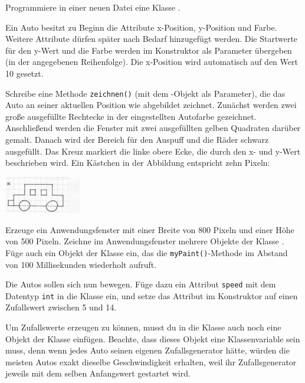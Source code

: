 \begin{compactenum}[a)]
\item Programmiere in einer neuen Datei eine Klasse .

\item Ein Auto besitzt zu Beginn die Attribute x-Position, y-Position und
Farbe. Weitere Attribute dürfen später nach Bedarf hinzugefügt werden. Die
Startwerte für den y-Wert und die Farbe werden im Konstruktor als Parameter
übergeben (in der angegebenen Reihenfolge). Die x-Position wird automatisch auf
den Wert 10 gesetzt.

Schreibe eine Methode \lstinline|zeichnen()| (mit dem -Objekt
als Parameter), die das Auto an seiner aktuellen Position wie abgebildet
zeichnet. Zunächst werden zwei große ausgefüllte Rechtecke in der eingestellten
Autofarbe gezeichnet. Anschließend werden die Fenster mit zwei ausgefüllten
gelben Quadraten darüber gemalt. Danach wird der Bereich für den Auspuff und
die Räder schwarz ausgefüllt. Das Kreuz markiert die linke obere Ecke, die durch
den x- und y-Wert beschrieben wird. Ein Kästchen in der Abbildung entspricht
zehn Pixeln:

\begin{center}
\includegraphics[width=0.25\textwidth]{./inf/SEKII/10_Java_Klassen/auto.jpg}
\end{center}

\item Erzeuge ein Anwendungsfenster mit einer Breite von 800 Pixeln und einer
Höhe von 500 Pixeln. Zeichne im Anwendungsfenster mehrere Objekte der Klasse
. Füge auch ein Objekt der Klasse  ein, das die
\lstinline|myPaint()|-Methode im Abstand von 100 Millisekunden wiederholt
aufruft.

\item Die Autos sollen sich nun bewegen. Füge dazu ein Attribut
\lstinline|speed| mit dem Datentyp \lstinline|int| in die Klasse ein, und setze
das Attribut im Konstruktor auf einen Zufallswert zwischen 5 und 14.

Um Zufallswerte erzeugen zu können, musst du in die Klasse  auch
noch eine Objekt der Klasse  einfügen. Beachte, dass dieses
Objekt eine Klassenvariable sein muss, denn wenn jedes Auto seinen eigenen
Zufallsgenerator hätte, würden die meisten Autos exakt dieselbe Geschwindigkeit
erhalten, weil ihr Zufallsgenerator jeweils mit dem selben Anfangswert gestartet
wird.


\end{compactenum}
